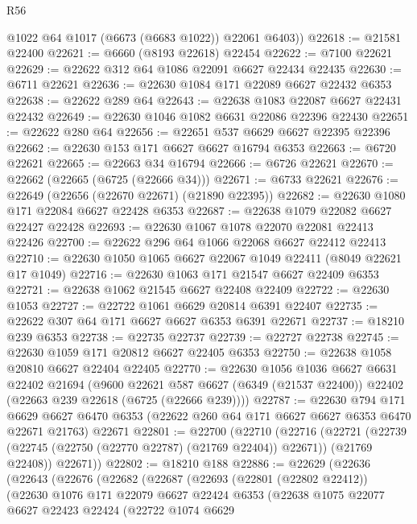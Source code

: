 \begin{lexlean}{R56}
\begin{coremodule}
        @1022
        @64
        @1017
        (@6673 (@6683 @1022))
        @22061
        @6403))
@22618 := @21581 @22400
@22621 := @6660 (@8193 @22618) @22454
@22622 := @7100 @22621
@22629 := @22622 @312 @64 @1086 @22091 @6627 @22434 @22435
@22630 := @6711 @22621
@22636 := @22630 @1084 @171 @22089 @6627 @22432 @6353
@22638 := @22622 @289 @64
@22643 := @22638 @1083 @22087 @6627 @22431 @22432
@22649 := @22630 @1046 @1082 @6631 @22086 @22396 @22430
@22651 := @22622 @280 @64
@22656 := @22651 @537 @6629 @6627 @22395 @22396
@22662 := @22630 @153 @171 @6627 @6627 @16794 @6353
@22663 := @6720 @22621
@22665 := @22663 @34 @16794
@22666 := @6726 @22621
@22670 := @22662 (@22665 (@6725 (@22666 @34)))
@22671 := @6733 @22621
@22676 := @22649 (@22656 (@22670 @22671) (@21890 @22395))
@22682 := @22630 @1080 @171 @22084 @6627 @22428 @6353
@22687 := @22638 @1079 @22082 @6627 @22427 @22428
@22693 := @22630 @1067 @1078 @22070 @22081 @22413 @22426
@22700 := @22622 @296 @64 @1066 @22068 @6627 @22412 @22413
@22710 := @22630 @1050 @1065 @6627 @22067 @1049 @22411 (@8049 @22621 @17 @1049)
@22716 := @22630 @1063 @171 @21547 @6627 @22409 @6353
@22721 := @22638 @1062 @21545 @6627 @22408 @22409
@22722 := @22630 @1053
@22727 := @22722 @1061 @6629 @20814 @6391 @22407
@22735 := @22622 @307 @64 @171 @6627 @6627 @6353 @6391 @22671
@22737 := @18210 @239 @6353
@22738 := @22735 @22737
@22739 := @22727 @22738
@22745 := @22630 @1059 @171 @20812 @6627 @22405 @6353
@22750 := @22638 @1058 @20810 @6627 @22404 @22405
@22770 := @22630
    @1056
    @1036
    @6627
    @6631
    @22402
    @21694
    (@9600
      @22621
      @587
      @6627
      (@6349 (@21537 @22400))
      @22402
      (@22663 @239 @22618 (@6725 (@22666 @239))))
@22787 := @22630
    @794
    @171
    @6629
    @6627
    @6470
    @6353
    (@22622 @260 @64 @171 @6627 @6627 @6353 @6470 @22671 @21763)
    @22671
@22801 := @22700
    (@22710
      (@22716
        (@22721 (@22739 (@22745 (@22750 (@22770 @22787) (@21769 @22404)) @22671)) (@21769 @22408))
        @22671))
@22802 := @18210 @188
@22886 := @22629
    (@22636
      (@22643
        (@22676
          (@22682
            (@22687
              (@22693
                (@22801 (@22802 @22412))
                (@22630
                  @1076
                  @171
                  @22079
                  @6627
                  @22424
                  @6353
                  (@22638
                    @1075
                    @22077
                    @6627
                    @22423
                    @22424
                    (@22722
                      @1074
                      @6629

\end{coremodule}
\end{lexlean}
